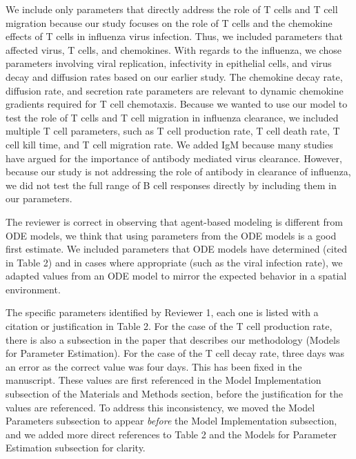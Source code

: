 \documentclass[10pt]{article}
\newcommand{\new}[1]{{\color{dkgreen}#1}}
\newenvironment{response}{\fontfamily{cms}\selectfont\small}{\par}
\begin{document}
\begin{enumerate}
\begin{response}
\begin{displayquote}
\new{We include only parameters that directly address the role of T cells and T cell migration because our study focuses on the role of T cells and the chemokine effects of T cells in influenza virus infection. Thus, we included parameters that affected virus, T cells, and chemokines. With regards to the influenza, we chose parameters involving viral replication, infectivity in epithelial cells, and virus decay and diffusion rates based on our earlier study.  The chemokine decay rate, diffusion rate, and secretion rate parameters are relevant to dynamic chemokine gradients required for T cell chemotaxis.  Because we wanted to use our model to test the role of T cells and T cell migration in influenza clearance, we included multiple T cell parameters, such as T cell production rate, T cell death rate, T cell kill time, and T cell migration rate.  We added IgM because many studies have argued for the importance of antibody mediated virus clearance. However, because our study is not addressing the role of antibody in clearance of influenza, we did not test the full range of B cell responses directly by including them in our parameters.}
\end{displayquote}

The reviewer is correct in observing that agent-based modeling is different from ODE models, we think that using parameters from the ODE models is a good first estimate.  We included parameters that ODE models have determined (cited in Table 2) and in cases where appropriate (such as the viral infection rate), we adapted values from an ODE model to mirror the expected behavior in a spatial environment.

The specific parameters identified by Reviewer 1, each one is listed with a citation or justification in Table 2.  For the case of the T cell production rate, there is also a subsection in the paper that describes our methodology (Models for Parameter Estimation).  For the case of the T cell decay rate, three days was an error as the correct value was four days.  This has been fixed in the manuscript.  These values are first referenced in the Model Implementation subsection of the Materials and Methods section, before the justification for the values are referenced.  To address this inconsistency, we moved the Model Parameters subsection to appear \textit{before} the Model Implementation subsection, and we added more direct references to Table 2 and the Models for Parameter Estimation subsection for clarity.


\end{response}
\end{enumerate}
\end{document}

